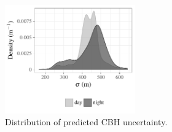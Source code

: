 \documentclass[essd,manuscript]{copernicus}\usepackage[]{graphicx}\usepackage[]{color}
\newenvironment{knitrout}{}{} %
\begin{document}

\begin{figure}
  \centering
\begin{knitrout}
\color{fgcolor}

{\centering \includegraphics[width=0.5\textwidth]{figure/method-cbase-rmse-1} 

}



\end{knitrout}
  \caption{Distribution of predicted CBH uncertainty.}
  \label{fig:uncertainty}
\end{figure}

\end{document}
